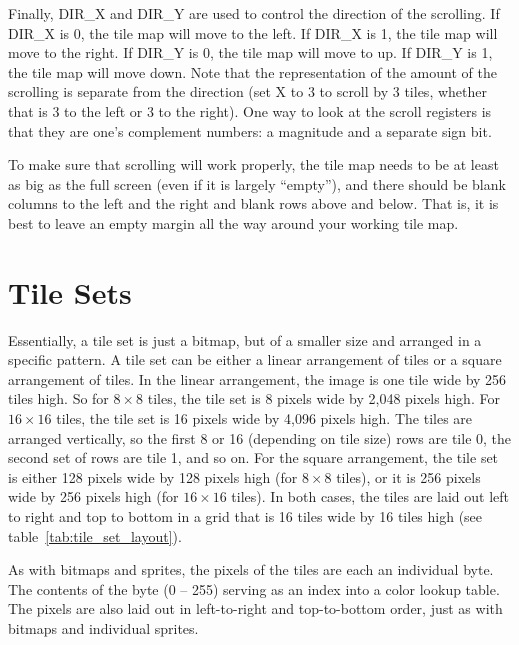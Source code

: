 Finally, DIR\_X and DIR\_Y are used to control the direction of the scrolling. If DIR\_X is 0, the tile map will move to the left. If DIR\_X is 1, the tile map will move to the right. If DIR\_Y is 0, the tile map will move to up. If DIR\_Y is 1, the tile map will move down. Note that the representation of the amount of the scrolling is separate from the direction (set X to 3 to scroll by 3 tiles, whether that is 3 to the left or 3 to the right). One way to look at the scroll registers is that they are one's complement numbers: a magnitude and a separate sign bit.

To make sure that scrolling will work properly, the tile map needs to be at least as big as the full screen (even if it is largely ``empty''), and there should be blank columns to the left and the right and blank rows above and below. That is, it is best to leave an empty margin all the way around your working tile map.

\section*{Tile Sets}

Essentially, a tile set is just a bitmap, but of a smaller size and arranged in a specific pattern. A tile set can be either a linear arrangement of tiles or a square arrangement of tiles. In the linear arrangement, the image is one tile wide by 256 tiles high. So for $8 \times 8$ tiles, the tile set is 8 pixels wide by 2,048 pixels high. For $16 \times 16$ tiles, the tile set is 16 pixels wide by 4,096 pixels high. The tiles are arranged vertically, so the first 8 or 16 (depending on tile size) rows are tile 0, the second set of rows are tile 1, and so on. For the square arrangement, the tile set is either 128 pixels wide by 128 pixels high (for $8 \times 8$ tiles), or it is 256 pixels wide by 256 pixels high (for $16 \times 16$ tiles). In both cases, the tiles are laid out left to right and top to bottom in a grid that is 16 tiles wide by 16 tiles high (see table~\ref{tab:tile_set_layout}).

As with bitmaps and sprites, the pixels of the tiles are each an individual byte. The contents of the byte (0 -- 255) serving as an index into a color lookup table. The pixels are also laid out in left-to-right and top-to-bottom order, just as with bitmaps and individual sprites.

